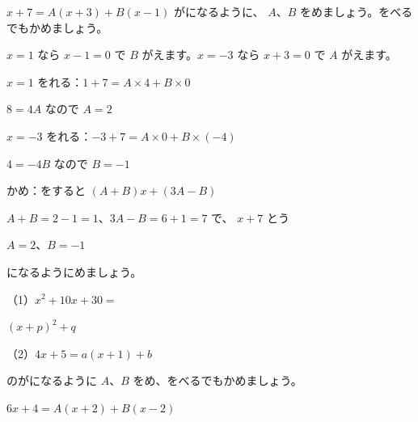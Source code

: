 \begin{reidai}[\R{数}{かず}を\R{代入}{だい|にゅう}して、\R{数}{かず}を\R{決}{き}める]
$x+7=A(x+3)+B(x-1)$ がになるように、 $A$、$B$ をめましょう。をべるでもかめましょう。\par
\kangaekata $x=1$ なら $x-1=0$ で $B$ がえます。$x=-3$ なら $x+3=0$ で $A$ がえます。\par
\shiki $x=1$ をれる：$1+7=A\times4+B\times0$\par
\hspace*{2.6\zw}$8=4A$ なので $A=2$\par
\hspace*{2.6\zw}$x=-3$ をれる：$-3+7=A\times0+B\times(-4)$\par
\hspace*{2.6\zw}$4=-4B$ なので $B=-1$\par
\hspace*{2.6\zw}かめ：をすると $(A+B)x+(3A-B)$\par
\hspace*{2.6\zw}$A+B=2-1=1$、$3A-B=6+1=7$ で、 $x+7$ とう\par
\kotae $A=2$、$B=-1$
\end{reidai}

\begingroup{}%
\noindent\begin{minipage}[t]{0.49\linewidth}
\begin{jibun}
になるようにめましょう。\par
（1）$x^2+10x+30=$\par
\hspace*{3\zw}$(x+p)^2+q$\par
（2）$4x+5=a(x+1)+b$
\end{jibun}
\end{minipage}\hfill
\begin{minipage}[t]{0.49\linewidth}
\begin{jibun}
のがになるように $A$、$B$ をめ、をべるでもかめましょう。\par
$6x+4=A(x+2)+B(x-2)$
\end{jibun}
\end{minipage}\par
\endgroup

